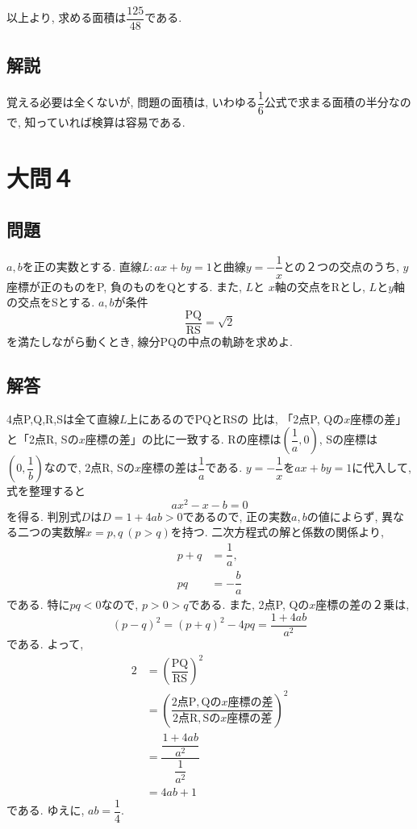 \documentclass[dvipdfmx,a4paper]{jsarticle}
\newcommand{\2}{I\hspace{-1pt}I}
\newcommand{\3}{I\hspace{-1pt}I\hspace{-1pt}I}
\begin{document}
    以上より, 求める面積は$\dfrac{125}{48}$である. 

    \subsection{解説}
    覚える必要は全くないが, 問題の面積は, いわゆる$\dfrac{1}{6}$公式で求まる面積の半分なので, 
    知っていれば検算は容易である. 

    \section{大問４}
    \subsection{問題}
    $a,b$を正の実数とする. 直線$L: ax+by=1$と曲線$y=-\dfrac{1}{x}$との２つの交点のうち, 
    $y$座標が正のものをP, 負のものをQとする. また, $L$と
    $x$軸の交点をRとし, $L$と$y$軸の交点をSとする. $a,b$が条件
    \begin{equation*}\mathrm{
        \dfrac{PQ}{RS} = \sqrt{2}
    }
    \end{equation*}
    を満たしながら動くとき, 線分PQの中点の軌跡を求めよ. 

    \subsection{解答}
    4点P,Q,R,Sは全て直線$L$上にあるのでPQとRSの
    比は, 「2点P, Qの$x$座標の差」と「2点R, Sの$x$座標の差」の比に一致する. 
    Rの座標は$\left(\dfrac{1}{a},0\right)$, 
    Sの座標は$\left(0,\dfrac{1}{b}\right)$なので, 
    2点R, Sの$x$座標の差は$\dfrac{1}{a}$である. 
    $y=-\dfrac{1}{x}$を$ax+by=1$に代入して, 式を整理すると
    \begin{equation*}
        ax^2-x -b =0
    \end{equation*}
    を得る. 判別式$D$は$D=1 + 4ab >0$であるので, 正の実数$a,b$の値によらず, 
    異なる二つの実数解$x=p,q \ (p>q)$を持つ. 
    二次方程式の解と係数の関係より, 
    \begin{align}
        p + q &= \dfrac{1}{a}, \\
        pq &= -\dfrac{b}{a}
    \end{align}
    である. 特に$pq<0$なので, $p>0>q$である. また, 2点P, Qの$x$座標の差の２乗は, 
    \[
        (p-q)^2 = (p+q)^2 - 4pq =\dfrac{1+4ab}{a^2}
    \]
    である. よって, 
    \begin{align*}
        2 &= \left(\dfrac{\mathrm{PQ}}{\mathrm{RS}} \right)^2 \\
        &= \left(\dfrac{\mathrm{2点P, Qの}x\mathrm{座標の差}}{\mathrm{2点R, Sの}x\mathrm{座標の差}} \right)^2 \\
        &= \dfrac{\dfrac{1+4ab}{a^2}}{\dfrac{1}{a^2}} \\
        &= 4ab + 1
    \end{align*}
    である. ゆえに, $ab=\dfrac{1}{4}$. 
\end{document}
